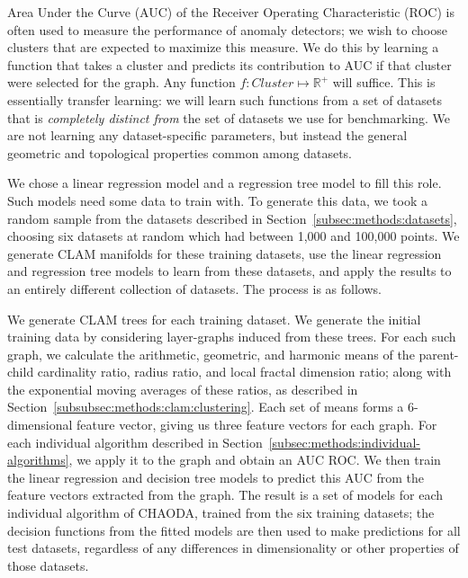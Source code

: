 Area Under the Curve (AUC) of the Receiver Operating Characteristic (ROC) is often used to measure the performance of anomaly detectors;
we wish to choose clusters that are expected to maximize this measure.
We do this by learning a function that takes a cluster and predicts its contribution to AUC if that cluster were selected for the graph.
Any function $f: Cluster \mapsto \mathbb{R}^+$ will suffice.
This is essentially transfer learning: we will learn such functions from a set of datasets that is \emph{completely distinct from} the set of datasets we use for benchmarking.
We are not learning any dataset-specific parameters, but instead the general geometric and topological properties common among datasets.

We chose a linear regression model and a regression tree model to fill this role.
Such models need some data to train with.
To generate this data, we took a random sample from the datasets described in Section~\ref{subsec:methods:datasets}, choosing six datasets at random which had between 1,000 and 100,000 points.
We generate CLAM manifolds for these training datasets, use the linear regression and regression tree models to learn from these datasets, and apply the results to an entirely different collection of datasets.
The process is as follows.

We generate CLAM trees for each training dataset.
We generate the initial training data by considering layer-graphs induced from these trees.
For each such graph, we calculate the arithmetic, geometric, and harmonic means of the parent-child cardinality ratio, radius ratio, and local fractal dimension ratio;
along with the exponential moving averages of these ratios, as described in Section~\ref{subsubsec:methods:clam:clustering}.
Each set of means forms a 6-dimensional feature vector, giving us three feature vectors for each graph.
For each individual algorithm described in Section~\ref{subsec:methods:individual-algorithms}, we apply it to the graph and obtain an AUC ROC\@.
We then train the linear regression and decision tree models to predict this AUC from the feature vectors extracted from the graph.
The result is a set of models for each individual algorithm of CHAODA, trained from the six training datasets;
the decision functions from the fitted models are then used to make predictions for all test datasets, regardless of any differences in dimensionality or other properties of those datasets.

